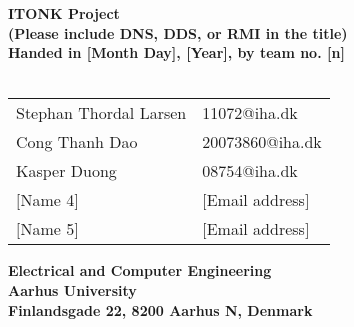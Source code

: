 \begin{titlepage}
\begin{center}
{\LARGE \textbf{ITONK Project}}\\
{\large \textbf{(Please include DNS, DDS, or RMI in the title)}}\\
\textbf{Handed in [Month Day], [Year], by team no. [n]}\\~\\
\begin{tabular}{ll}
Stephan Thordal Larsen  & 11072@iha.dk \\
Cong Thanh Dao & 20073860@iha.dk \\
Kasper Duong & 08754@iha.dk \\
$[$Name 4$]$  & $[$Email address$]$ \\
$[$Name 5$]$  & $[$Email address$]$ \\
\end{tabular}
\vfill
\textbf{Electrical and Computer Engineering}\\
\textbf{Aarhus University}\\
\textbf{Finlandsgade 22, 8200 Aarhus N, Denmark}
\end{center}
\end{titlepage}